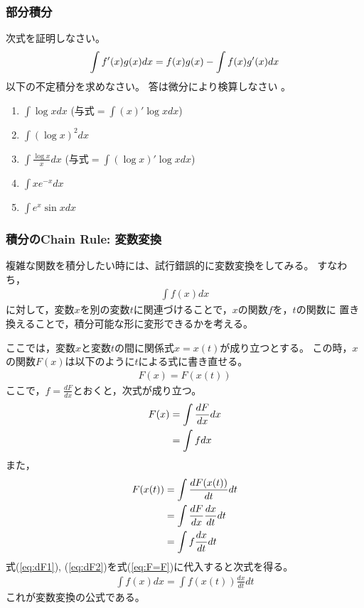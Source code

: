 \documentclass[twocolumn,11pt]{jarticle}
\begin{document}
\subsubsection{部分積分}
\question
次式を証明しなさい。
\begin{align}
  \int f'(x)g(x)dx = f(x)g(x)-\int f(x)g'(x)dx\notag
\end{align}
\exercise
以下の不定積分を求めなさい。
答は微分により検算しなさい
。
\begin{enumerate}
\item \label{item:logx}$\displaystyle\int \log x dx$
  \quad(与式$=\int(x)'\log x dx$)
\item \label{item:(logx)2}$\displaystyle\int (\log x)^2 dx$
\item \label{item:logx/x}$\displaystyle\int \frac{\log x}{x}dx$
  \quad(与式$=\int(\log x)'\log x dx$)
\item \label{item:xe-x}$\displaystyle\int xe^{-x} dx$
\item \label{item:e2sinx}$\displaystyle\int e^x\sin x dx$
\end{enumerate}

\subsubsection{積分のChain Rule: 変数変換}
複雑な関数を積分したい時には、試行錯誤的に変数変換をしてみる。
すなわち，
\begin{align*}
  \int f(x)dx
\end{align*}
に対して，変数$x$を別の変数$t$に関連づけることで，$x$の関数$f$を，$t$の関数に
置き換えることで，積分可能な形に変形できるかを考える。

ここでは，変数$x$と変数$t$の間に関係式$x=x(t)$が成り立つとする。
この時，$x$の関数$F(x)$は以下のように$t$による式に書き直せる。
\begin{align}
\label{eq:F=F}
F(x)=F(x(t))
\end{align}
ここで，$\displaystyle f=\frac{dF}{dx}$とおくと，次式が成り立つ。
\begin{align}
	F(x)&=\int\frac{dF}{dx}dx\notag\\
	&=\int fdx
\label{eq:dF1}
\end{align}
また，
\begin{align}
F(x(t))&=\int\frac{dF(x(t))}{dt}dt\notag\\
	&=\int\frac{dF}{dx}\frac{dx}{dt}dt\notag\\
	&=\int f\frac{dx}{dt}dt
\label{eq:dF2}
\end{align}
式(\ref{eq:dF1}), (\ref{eq:dF2})を式(\ref{eq:F=F})に代入すると次式を得る。
\begin{align*}
  \int f(x)dx=\int f(x(t))\frac{dx}{dt}dt
\end{align*}
これが変数変換の公式である。
\end{document}
